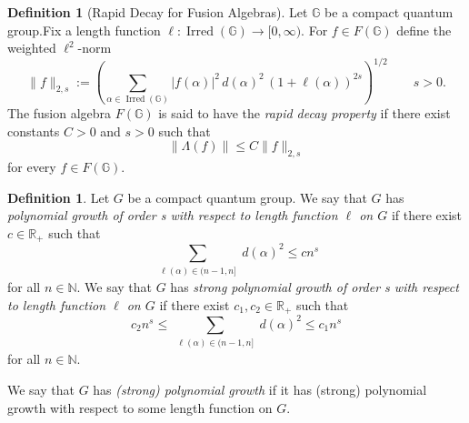 \documentclass[12pt, reqno]{amsart}
\theoremstyle{definition}
\newtheorem{definition}[theorem]{Definition}
\theoremstyle{remark}
\numberwithin{equation}{section}
\begin{document}
\begin{definition}[Rapid Decay for Fusion Algebras]\label{rapid decay}
Let $\mathbb{G}$ be a compact  quantum group.Fix a length function \(\ell : \operatorname{Irred}(\mathbb{G}) \to [0,\infty)\). For \(f \in F(\mathbb{G})\) define the weighted \(\ell^2\)-norm
\[
\|f\|_{2,s} := \left( \sum_{\alpha \in \operatorname{Irred}(\mathbb{G})} |f(\alpha)|^2 \, d(\alpha)^2 \, (1+\ell(\alpha))^{2s} \right)^{1/2} \qquad s>0.
\]
 The fusion algebra \(F(\mathbb{G})\) is said to have the \emph{rapid decay property} if there exist constants \(C>0\) and \(s>0\) such that
\[
\|\Lambda(f)\| \le C \|f\|_{2,s}
\]
for every \(f \in F(\mathbb{G})\).
\end{definition}

\begin{definition}\label{polynomial growth}
    Let \( G \) be a compact quantum group. We say that \( G \) has 
    \emph{polynomial growth of order s with respect to length function \(\ell\) on \( G \)} 
    if there exist \(c\in\mathbb{R}_+\) such that
    \[
    \sum_{\substack{\ell(\alpha) \in (n-1, n]}} d(\alpha)^2 \leq c n^s
    \]
    for all \( n \in \mathbb{N} \).
    We say that \( G \) has \emph{strong polynomial growth of order s with respect to 
    length function \(\ell\) on \( G \)} if there exist 
    \(c_1,c_2\in\mathbb{R}_+\) such that
    \[
    c_2 n^s \leq \sum_{\substack{\ell(\alpha) \in (n-1, n]}} d(\alpha)^2 
    \leq c_1 n^s
    \]
    for all \( n \in \mathbb{N} \).

    We say that \( G \) has \emph{(strong) polynomial growth} if it has 
    (strong) polynomial growth with respect to some length function on \( G \).
\end{definition}
\end{document}
